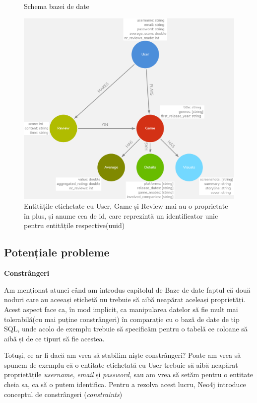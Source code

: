 \documentclass[12pt,a4paper]{report}
\begin{document}
\begin{figure}[H]
\centering
\caption{Schema bazei de date}
\includegraphics[scale=0.4]{exemplu_5_neo4j}
\caption*{Entitățile etichetate cu User, Game și Review mai au o proprietate în plus, și anume cea de id, care reprezintă un identificator unic pentru entitățile respective(uuid)}
\end{figure}

\subsection{Potențiale probleme}

\bigskip
\textbf{Constrângeri}
\bigskip

Am menționat atunci când am introdus capitolul de Baze de date faptul că două noduri care au aceeași etichetă nu trebuie să aibă neapărat aceleași proprietăți. Acest aspect face ca, în mod implicit, ca manipularea datelor să fie mult mai tolerabilă(cu mai puține constrângeri) în comparație cu o bază de date de tip SQL, unde acolo de exemplu trebuie să specificăm pentru o tabelă ce coloane să aibă și de ce tipuri să fie acestea.

Totuși, ce ar fi dacă am vrea să stabilim niște constrângeri? Poate am vrea să spunem de exemplu că o entitate etichetată cu User trebuie să aibă neapărat proprietățile \emph{username}, \emph{email} și \emph{password}, sau am vrea să setăm pentru o entitate cheia sa, ca să o putem identifica. Pentru a rezolva acest lucru, Neo4j introduce conceptul de constrângeri (\emph{constraints}) \cite{12}
\end{document}
